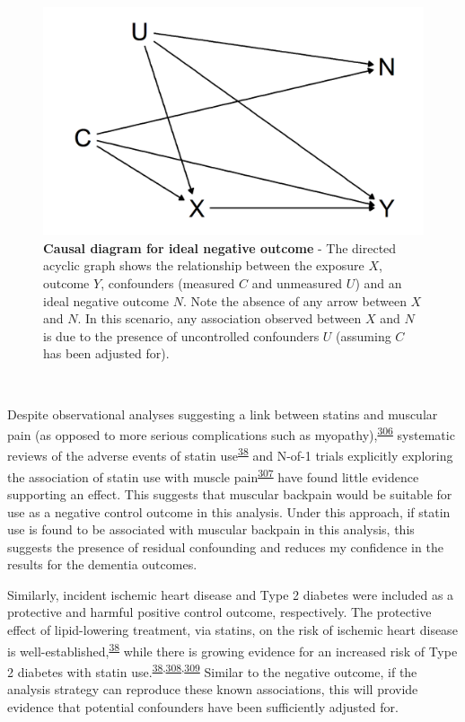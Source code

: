 \documentclass[a4paper, twoside]{templates/ociamthesis}
\begin{document}
\begin{figure}[H]

{\centering \includegraphics[width=0.8\linewidth]{figures/cprd-analysis/negativeOutcome} 

}

\caption[Causal diagram for ideal negative outcome]{\textbf{Causal diagram for ideal negative outcome} - The directed acyclic graph shows the relationship between the exposure \(X\), outcome \(Y\), confounders (measured \(C\) and unmeasured \(U\)) and an ideal negative outcome \(N\). Note the absence of any arrow between \(X\) and \(N\). In this scenario, any association observed between \(X\) and \(N\) is due to the presence of uncontrolled confounders \(U\) (assuming \(C\) has been adjusted for).}\label{fig:negativeOutcome}
\end{figure}

~

Despite observational analyses suggesting a link between statins and muscular pain (as opposed to more serious complications such as myopathy),\textsuperscript{\protect\hyperlink{ref-selva-ocallaghan2018}{306}} systematic reviews of the adverse events of statin use\textsuperscript{\protect\hyperlink{ref-collins2016}{38}} and N-of-1 trials explicitly exploring the association of statin use with muscle pain\textsuperscript{\protect\hyperlink{ref-herrett2021}{307}} have found little evidence supporting an effect. This suggests that muscular backpain would be suitable for use as a negative control outcome in this analysis. Under this approach, if statin use is found to be associated with muscular backpain in this analysis, this suggests the presence of residual confounding and reduces my confidence in the results for the dementia outcomes.

Similarly, incident ischemic heart disease and Type 2 diabetes were included as a protective and harmful positive control outcome, respectively. The protective effect of lipid-lowering treatment, via statins, on the risk of ischemic heart disease is well-established,\textsuperscript{\protect\hyperlink{ref-collins2016}{38}} while there is growing evidence for an increased risk of Type 2 diabetes with statin use.\textsuperscript{\protect\hyperlink{ref-collins2016}{38},\protect\hyperlink{ref-macedo2014}{308},\protect\hyperlink{ref-smit2020}{309}} Similar to the negative outcome, if the analysis strategy can reproduce these known associations, this will provide evidence that potential confounders have been sufficiently adjusted for.
\end{document}
